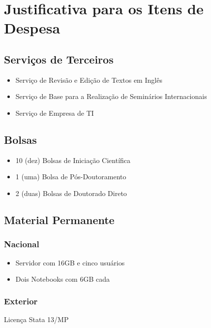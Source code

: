 \documentclass[
	12pt,				%
	openright,			%
	twoside,			%
	a4paper,			%
	english,			%
	french,				%
	spanish,			%
	brazil,				%
	]{abntex2}
\begin{document}
% 


\chapter{Justificativa para os Itens de Despesa}

\section{Serviços de Terceiros}

\begin{itemize}
\item Serviço de Revisão e Edição de Textos em Inglês
\item Serviço de Base para a Realização de Seminários Internacionais
\item Serviço de Empresa de TI


\end{itemize}

\section{Bolsas}

\begin{itemize}
\item 10 (dez) Bolsas de Iniciação Científica
\item 1 (uma) Bolsa de Pós-Doutoramento
\item 2 (duas) Bolsas de Doutorado Direto
\end{itemize}

\section{Material Permanente}

\subsection{Nacional}
\begin{itemize}
\item Servidor com 16GB e cinco usuários
\item Dois Notebooks com 6GB cada
\end{itemize}

\subsection{Exterior}
Licença Stata 13/MP
\end{document}
